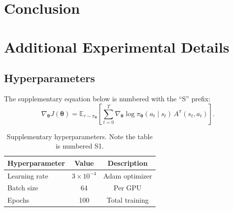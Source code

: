 \documentclass[10pt]{article}
\begin{document}
\lipsum[6-7]

\section{Conclusion}

\lipsum[8]





\makeappendixtitle

\section{Additional Experimental Details}
\label{app:details}

\subsection{Hyperparameters}
\label{app:hyperparams}

\lipsum[9]

The supplementary equation below is numbered with the ``S'' prefix:
\begin{equation}
    \nabla_{\bm{\theta}} J(\bm{\theta}) = \mathbb{E}_{\tau \sim \pi_{\bm{\theta}}} \left[ \sum_{t=0}^{T} \nabla_{\bm{\theta}} \log \pi_{\bm{\theta}}(a_t \mid s_t) \, A^{\pi}(s_t, a_t) \right].
    \label{eq:supp-pg}
\end{equation}

\begin{table}[htbp]
    \centering
    \begin{tabular}{lcc}
        \toprule
        Hyperparameter & Value & Description \\
        \midrule
        Learning rate & $3 \times 10^{-4}$ & Adam optimizer \\
        Batch size & 64 & Per GPU \\
        Epochs & 100 & Total training \\
        \bottomrule
    \end{tabular}
    \caption{Supplementary hyperparameters. Note the table is numbered S1.}
    \label{tab:supp-hyper}
\end{table}
\end{document}
